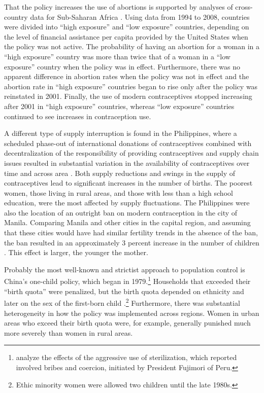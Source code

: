 That the policy increases the use of abortions is supported by analyses of cross-country data for Sub-Saharan Africa \citep{Bendavid2011}. Using data from 1994 to 2008, countries were divided into ``high exposure'' and ``low exposure'' countries, depending on the level of financial assistance per capita provided by the United States when the policy was not active. The probability of having an abortion for a woman in a ``high exposure'' country was more than twice that of a woman in a ``low exposure'' country when the policy was in effect. Furthermore, there was no apparent difference in abortion rates when the policy was not in effect and the abortion rate in ``high exposure'' countries began to rise only after the policy was reinstated in 2001. Finally, the use of modern contraceptives stopped increasing after 2001 in ``high exposure'' countries, whereas ``low exposure'' countries continued to see increases in contraception use.

A different type of supply interruption is found in the Philippines, where a scheduled phase-out of international donations of contraceptives combined with decentralization of the responsibility of providing contraceptives and supply chain issues resulted in substantial variation in the availability of contraceptives over time and across area \citep{Salas2014}. Both supply reductions and swings in the supply of contraceptives lead to significant increases in the number of births. The poorest women, those living in rural areas, and those with less than a high school education, were the most affected by supply fluctuations. The Philippines were also the location of an outright ban on modern contraception in the city of Manila. Comparing Manila and other cities in the capital region, and assuming that these cities would have had similar fertility trends in the absence of the ban, the ban resulted in an approximately 3 percent increase in the number of children \citep{Dumas2017}. This effect is larger, the younger the mother.

Probably the most well-known and strictist approach to population control is China's one-child policy, which began in 1979.\footnote{\citet{Byker2012} analyze the effects of the aggressive use of sterilization, which reported involved bribes and coercion, initiated by President Fujimori of Peru.} Households that exceeded their ``birth quota'' were penalized, but the birth quota depended on ethnicity and later on the sex of the first-born child \citep{Li2005}.\footnote{Ethic minority women were allowed two children until the late 1980s.} Furthermore, there was substantial heterogeneity in how the policy was implemented across regions. Women in urban areas who exceed their birth quota were, for example, generally punished much more severely than women in rural areas.

